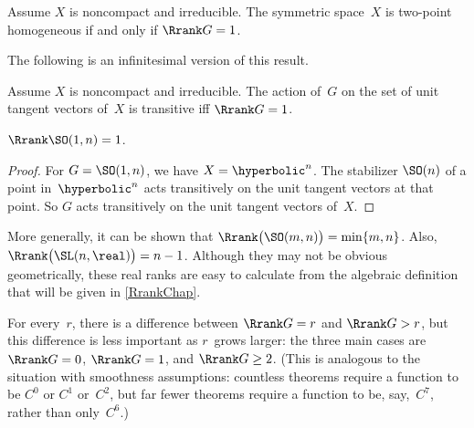 \begin{prop} \label{2ptHomog}
 Assume $X$ is noncompact and irreducible. The symmetric space~$X$ is
two-point homogeneous if and only if\/ $\Rrank G = 1$.
 \end{prop}

The following is an infinitesimal version of this result.

\begin{prop} \label{Rrank1->transitive}
 Assume $X$ is noncompact and irreducible. 
 The action of~$G$ on the set of unit tangent vectors
of~$X$ is transitive iff\/ $\Rrank G = 1$. 
 \end{prop}

\begin{cor}
 $\Rrank  \SO(1,n) = 1$.
 \end{cor}

\begin{proof}
 For $G = \SO(1,n)$, we have $X = \hyperbolic^n$. The stabilizer
$\SO(n)$ of a point in~$\hyperbolic^n$ acts transitively on the unit
tangent vectors at that point. So $G$ acts transitively on the unit
tangent vectors of~$X$.
 \end{proof}
 
More generally, it can be shown that $\Rrank \bigl( \SO(m,n) \bigr) = \min\{m,n\}$. Also,
$\Rrank \bigl( \SL(n,\real) \bigr) = n-1$. Although they may not be obvious geometrically, these real ranks are easy to calculate from the algebraic
definition that will be given in \cref{RrankChap}.

\begin{rem}
For every~$r$, there is a difference between $\Rrank G =
r$ and $\Rrank G > r$, but this difference is less
important as $r$~grows larger: the three main cases are
$\Rrank G = 0$, $\Rrank G = 1$, and $\Rrank G \ge 2$.
(This is analogous to the situation with smoothness
assumptions: countless theorems require a function to be
$C^0$ or $C^1$ or~$C^2$, but far fewer theorems require a
function to be, say,~$C^7$, rather than only~$C^6$.)
\end{rem}

%


